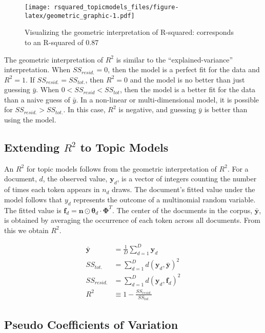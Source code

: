 \documentclass[conference,final,]{IEEEtran}
\makeatletter
\def\maxwidth{\ifdim\Gin@nat@width>\linewidth\linewidth
\else\Gin@nat@width\fi}
\let\Oldincludegraphics\includegraphics
\renewcommand{\includegraphics}[1]{\Oldincludegraphics[width=\maxwidth]{#1}}
\makeatother
\begin{document}
\begin{figure}
\centering
\texttt{[image: rsquared\_topicmodels\_files/figure-latex/geometric\_graphic-1.pdf]}
\caption{Visualizing the geometric interpretation of R-squared:
corresponds to an R-squared of 0.87}
\end{figure}

The geometric interpretation of \(R^2\) is similar to the
``explained-variance'' interpretation. When \(SS_{resid.} = 0\), then
the model is a perfect fit for the data and \(R^2 = 1\). If
\(SS_{resid.} = SS_{tot.}\), then \(R^2 = 0\) and the model is no better
than just guessing \(\bar{y}\). When \(0 < SS_{resid} < SS_{tot}\), then
the model is a better fit for the data than a naive guess of
\(\bar{y}\). In a non-linear or multi-dimensional model, it is possible
for \(SS_{resid.} > SS_{tot.}\). In this case, \(R^2\) is negative, and
guessing \(\bar{y}\) is better than using the model.

\hypertarget{extending-r2-to-topic-models}{%
\subsection{\texorpdfstring{Extending \(R^2\) to Topic
Models}{Extending R\^{}2 to Topic Models}}\label{extending-r2-to-topic-models}}

An \(R^2\) for topic models follows from the geometric interpretation of
\(R^2\). For a document, \(d\), the observed value, \(\mathbf{y}_d\), is
a vector of integers counting the number of times each token appears in
\(n_d\) draws. The document's fitted value under the model follows that
\(y_d\) represents the outcome of a multinomial random variable. The
fitted value is
\(\mathbf{f}_d = \mathbf{n} \odot \boldsymbol\theta_d \cdot \boldsymbol\Phi^T\).
The center of the documents in the corpus, \(\bar{\mathbf{y}}\), is
obtained by averaging the occurrence of each token across all documents.
From this we obtain \(R^2\).

\begin{align}
    \bar{\mathbf{y}} &= \frac{1}{D}\sum_{d=1}^{D}\mathbf{y}_d\\
    SS_{tot.} &= \sum_{d=1}^D{d(\mathbf{y}_d, \bar{\mathbf{y}})^2}\\
    SS_{resid.} &= \sum_{d=1}^D{d(\mathbf{y}_d, \mathbf{f}_d)^2}\\
    R^2 &\equiv 1 - \frac{SS_{resid.}}{SS_{tot.} }
\end{align}

\hypertarget{pseudo-coefficients-of-variation}{%
\subsection{Pseudo Coefficients of
Variation}\label{pseudo-coefficients-of-variation}}
\end{document}
